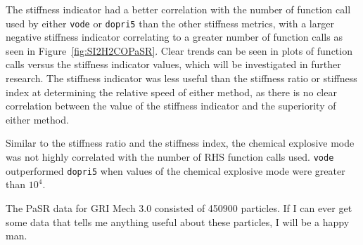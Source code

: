 \documentclass[12pt]{ussci}
\begin{document}
The stiffness indicator had a better correlation with the number of function call used by either \texttt{vode} or \texttt{dopri5} than the other stiffness metrics, with a larger negative stiffness indicator correlating to a greater number of function calls as seen in Figure~\ref{fig:SI2H2COPaSR}.
Clear trends can be seen in plots of function calls versus the stiffness indicator values, which will be investigated in further research.
The stiffness indicator was less useful than the stiffness ratio or stiffness index at determining the relative speed of either method, as there is no clear correlation between the value of the stiffness indicator and the superiority of either method.

Similar to the stiffness ratio and the stiffness index, the chemical explosive mode was not highly correlated with the number of RHS function calls used.  \texttt{vode} outperformed \texttt{dopri5} when values of the chemical explosive mode were greater than $10^4$.

The PaSR data for GRI Mech 3.0 consisted of 450900 particles.  If I can ever get some data that tells me anything useful about these particles, I will be a happy man.
\end{document}
